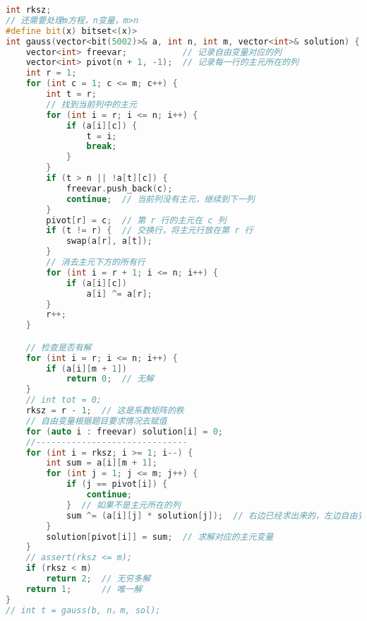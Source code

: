 \begin{lstlisting}[language=C++]
int rksz;
// 还需要处理m方程，n变量，m>n
#define bit(x) bitset<(x)>
int gauss(vector<bit(5002)>& a, int n, int m, vector<int>& solution) {
    vector<int> freevar;           // 记录自由变量对应的列
    vector<int> pivot(n + 1, -1);  // 记录每一行的主元所在的列
    int r = 1;
    for (int c = 1; c <= m; c++) {
        int t = r;
        // 找到当前列中的主元
        for (int i = r; i <= n; i++) {
            if (a[i][c]) {
                t = i;
                break;
            }
        }
        if (t > n || !a[t][c]) {
            freevar.push_back(c);
            continue;  // 当前列没有主元，继续到下一列
        }
        pivot[r] = c;  // 第 r 行的主元在 c 列
        if (t != r) {  // 交换行，将主元行放在第 r 行
            swap(a[r], a[t]);
        }
        // 消去主元下方的所有行
        for (int i = r + 1; i <= n; i++) {
            if (a[i][c])
                a[i] ^= a[r];
        }
        r++;
    }

    // 检查是否有解
    for (int i = r; i <= n; i++) {
        if (a[i][m + 1])
            return 0;  // 无解
    }
    // int tot = 0;
    rksz = r - 1;  // 这是系数矩阵的秩
    // 自由变量根据题目要求情况去赋值
    for (auto i : freevar) solution[i] = 0;
    //------------------------------
    for (int i = rksz; i >= 1; i--) {
        int sum = a[i][m + 1];
        for (int j = 1; j <= m; j++) {
            if (j == pivot[i]) {
                continue;
            }  // 如果不是主元所在的列
            sum ^= (a[i][j] * solution[j]);  // 右边已经求出来的，左边自由变量遗留
        }
        solution[pivot[i]] = sum;  // 求解对应的主元变量
    }
    // assert(rksz <= m);
    if (rksz < m)
        return 2;  // 无穷多解
    return 1;      // 唯一解
}
// int t = gauss(b, n，m, sol);
\end{lstlisting}
